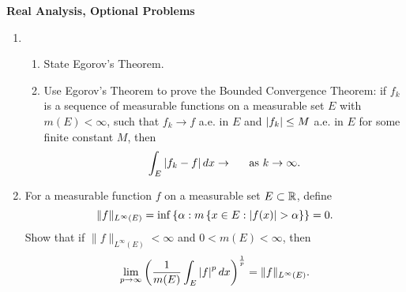 \documentclass[11pt,twoside]{amsart}
\theoremstyle{plain}
\begin{document}
\begin{center}
    {\bf\Large Real Analysis, Optional Problems}
\end{center}
\setcounter{enumi}{2}
\begin{enumerate}
    \item \begin{enumerate}
    \item State Egorov's Theorem.
    \item Use Egorov's Theorem to prove the Bounded Convergence Theorem: if ${f_k}$ is a sequence of measurable functions on a measurable set $E$ with $m(E) < \infty$, such that $f_k \rightarrow f$ a.e. in $E$ and $\left| f_k \right| \leq M$ a.e. in $E$ for some finite constant $M$, then
    \[
        \int_E{\left| f_k-f \right|dx}\rightarrow \textrm{\hspace{12pt} as } k\rightarrow\infty.
    \]
    \end{enumerate}
    \vspace{12pt}
    \item For a measurable function $f$ on a measurable set $E\subset\mathbb{R}$, define
    \[
        \| f \|_{L^{\infty}(E)} = \inf\left\{\alpha : m\left\{x\in E : \card{f(x)}>\alpha\right\}\right\} = 0.
    \]
    Show that if $\| f \|_{L^{\infty}(E)} < \infty$ and $0 < m(E) < \infty$, then
    \[
        \lim_{p\rightarrow\infty}\left(\frac{1}{m(E)}\int_{E}{\left| f \right|^pdx}\right)^{\frac{1}{p}} = \| f \|_{L^{\infty}(E)}.
    \]
\end{enumerate}
\end{document}
